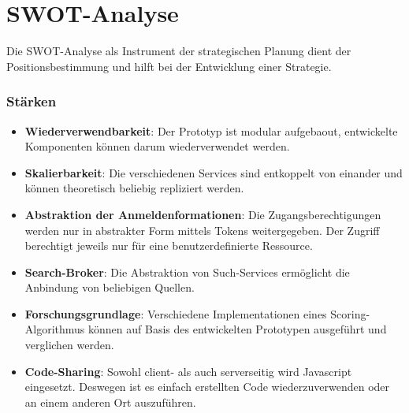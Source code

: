 
\section{SWOT-Analyse}

Die SWOT-Analyse als Instrument der strategischen Planung dient der Positionsbestimmung und hilft bei der Entwicklung einer Strategie.

\subsubsection{Stärken}

\begin{itemize}
    \item \textbf{Wiederverwendbarkeit}: Der Prototyp ist modular aufgebaout, entwickelte Komponenten können darum wiederverwendet werden.
    \item \textbf{Skalierbarkeit}: Die verschiedenen Services sind entkoppelt von einander und können theoretisch beliebig repliziert werden.
    \item \textbf{Abstraktion der Anmeldenformationen}: Die Zugangsberechtigungen werden nur in abstrakter Form mittels Tokens weitergegeben. Der Zugriff berechtigt jeweils nur für eine benutzerdefinierte Ressource.
    \item \textbf{Search-Broker}: Die Abstraktion von Such-Services ermöglicht die Anbindung von beliebigen Quellen.
    \item \textbf{Forschungsgrundlage}: Verschiedene Implementationen eines Sco\-ring-Algorithmus können auf Basis des entwickelten Prototypen ausgeführt und verglichen werden.
    \item \textbf{Code-Sharing}: Sowohl client- als auch serverseitig wird Javascript eingesetzt. Deswegen ist es einfach erstellten Code wiederzuverwenden oder an einem anderen Ort auszuführen.
\end{itemize}

